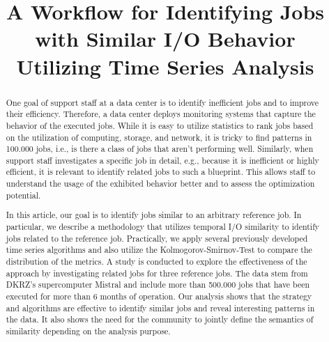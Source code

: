 \documentclass{jhps}
\begin{document}


\title{A Workflow for Identifying Jobs with Similar I/O Behavior Utilizing Time Series Analysis}


\maketitle


\begin{abstract}

One goal of support staff at a data center is to identify inefficient jobs and to improve their efficiency.
Therefore, a data center deploys monitoring systems that capture the behavior of the executed jobs.
While it is easy to utilize statistics to rank jobs based on the utilization of computing, storage, and network, it is tricky to find patterns in 100.000 jobs, i.e., is there a class of jobs that aren't performing well.
Similarly, when support staff investigates a specific job in detail, e.g., because it is inefficient or highly efficient, it is relevant to identify related jobs to such a blueprint.
This allows staff to understand the usage of the exhibited behavior better and to assess the optimization potential.

\medskip

In this article, our goal is to identify jobs similar to an arbitrary reference job. In particular, we describe a methodology that utilizes temporal I/O similarity to identify jobs related to the reference job.
Practically, we apply several previously developed time series algorithms and also utilize the Kolmogorov-Smirnov-Test to compare the distribution of the metrics.
A study is conducted to explore the effectiveness of the approach by investigating  related jobs for three reference jobs.
The data stem from DKRZ's supercomputer Mistral and include more than 500.000 jobs that have been executed for more than 6 months of operation. Our analysis shows that the strategy and algorithms are effective to identify similar jobs and reveal interesting patterns in the data.
It also shows the need for the community to jointly define the semantics of similarity depending on the analysis purpose.
\end{abstract}
\end{document}
